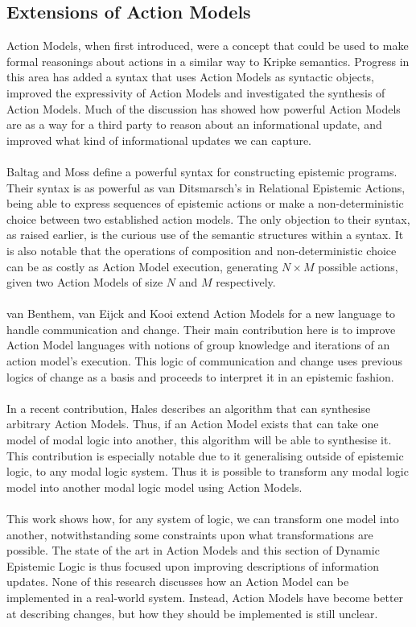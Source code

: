 \documentclass[12pt, a4paper, twoside]{article}
\begin{document}
\subsection{Extensions of Action Models}
Action Models, when first introduced, were a concept that could be used to make
formal reasonings about actions in a similar way to Kripke semantics.
Progress in this area has added a syntax that uses Action Models as syntactic
objects, improved the expressivity of Action Models and investigated the
synthesis of Action Models.
Much of the discussion has showed how powerful Action Models are as a way for a
third party to reason about an informational update, and improved what kind of
informational updates we can capture.\\
\\
Baltag and Moss define a powerful syntax for constructing epistemic programs.
Their syntax is as powerful as van Ditsmarsch's in Relational Epistemic Actions,
being able to express sequences of epistemic actions or make a non-deterministic
choice between two established action models.
The only objection to their syntax, as raised earlier, is the curious use of
the semantic structures within a syntax.
It is also notable that the operations of composition and non-deterministic
choice can be as costly as Action Model execution, generating $N \times M$
possible actions, given two Action Models of size $N$ and $M$
respectively.\citep{baltag2005programs}\\
\\
van Benthem, van Eijck and Kooi extend Action Models for a new language to
handle communication and change.
Their main contribution here is to improve Action Model languages with notions
of group knowledge and iterations of an action model's execution.
This logic of communication and change uses previous logics of change as a basis
and proceeds to interpret it in an epistemic fashion.\citep{benthem2006lcc}\\
\\
In a recent contribution, Hales describes an algorithm that can synthesise arbitrary
Action Models.
Thus, if an Action Model exists that can take one model of modal logic into
another, this algorithm will be able to synthesise it.
This contribution is especially notable due to it generalising outside of
epistemic logic, to any modal logic system.
Thus it is possible to transform any modal logic model into another modal logic
model using Action Models.\citep{hales13synthesis}\\
\\
This work shows how, for any system of logic, we can transform one model into
another, notwithstanding some constraints upon what transformations are
possible.
The state of the art in Action Models and this section of Dynamic Epistemic
Logic is thus focused upon improving descriptions of information updates.
None of this research discusses how an Action Model can be implemented in a
real-world system.
Instead, Action Models have become better at describing changes, but how they
should be implemented is still unclear.
\end{document}
